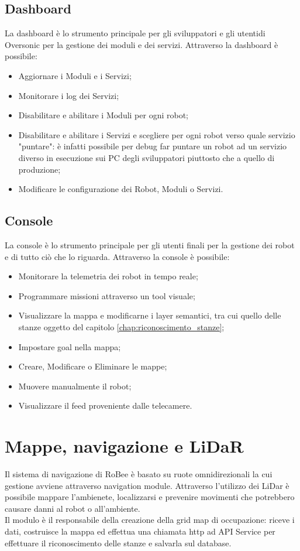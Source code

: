 \subsection{Dashboard}
La dashboard è lo strumento principale per gli sviluppatori e gli utentidi Oversonic per la gestione dei moduli e dei servizi. Attraverso la dashboard è possibile:
\begin{itemize}
  \item Aggiornare i Moduli e i Servizi;
  \item Monitorare i log dei Servizi;
  \item Disabilitare e abilitare i Moduli per ogni robot;
  \item Disabilitare e abilitare i Servizi e scegliere per ogni robot verso quale servizio "puntare": è infatti possibile per debug far puntare un robot ad un servizio diverso in esecuzione sui PC degli sviluppatori piuttosto che a quello di produzione;
  \item Modificare le configurazione dei Robot, Moduli o Servizi.
\end{itemize}
\subsection{Console}
La console è lo strumento principale per gli utenti finali per la gestione dei robot e di tutto ciò che lo riguarda. Attraverso la console è possibile:
\begin{itemize}
  \item Monitorare la telemetria dei robot in tempo reale;
  \item Programmare missioni attraverso un tool visuale;
  \item Visualizzare la mappa e modificarne i layer semantici, tra cui quello delle stanze oggetto del capitolo \ref{chap:riconoscimento_stanze};
  \item Impostare goal nella mappa;
  \item Creare, Modificare o Eliminare le mappe;
  \item Muovere manualmente il robot;
  \item Visualizzare il feed proveniente dalle telecamere.
\end{itemize}

\section{Mappe, navigazione e LiDaR}
Il sistema di navigazione di RoBee è basato su ruote omnidirezionali la cui gestione avviene attraverso navigation module. Attraverso l'utilizzo dei LiDar è possibile mappare l'ambienete, localizzarsi e prevenire movimenti che potrebbero causare danni al robot o all'ambiente.\\
Il modulo è il responsabile della creazione della grid map di occupazione: riceve i dati, costruisce la mappa ed effettua una chiamata http ad API Service per effettuare il riconoscimento delle stanze e salvarla sul database.

